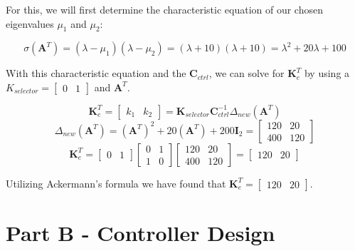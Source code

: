 \documentclass{article}
\begin{document}
For this, we will first determine the characteristic equation of our chosen eigenvalues $\mu_1$ and $\mu_2$:

\begin{equation}
    \sigma(\boldsymbol{A}^T) = (\lambda-\mu_1)(\lambda-\mu_2) = (\lambda+10)(\lambda+10) = \lambda^2 + 20 \lambda + 100
\end{equation}

With this characteristic equation and the $\boldsymbol{C}_{ctrl}$, we can solve for $\boldsymbol{K}_e^T$ by using a $K_{selector}=\begin{bmatrix}
    0 & 1
\end{bmatrix}$ and $\boldsymbol{A}^T$.

\begin{equation}
    \boldsymbol{K}_e^T = \begin{bmatrix}k_1 & k_2\end{bmatrix} = \boldsymbol{K}_{selector} \boldsymbol{C}_{ctrl}^{-1} \Delta_{new}(\boldsymbol{A}^T)
\end{equation}
\begin{equation}
    \Delta_{new}(\boldsymbol{A}^T) = (\boldsymbol{A}^T)^2+20(\boldsymbol{A}^T)+200\boldsymbol{I}_2 = \begin{bmatrix}
        120 & 20 \\ 400 & 120
    \end{bmatrix}
\end{equation}
\begin{equation}
    \boldsymbol{K}_e^T = \begin{bmatrix}
        0 & 1
    \end{bmatrix} \begin{bmatrix}
        0 & 1 \\ 1 & 0
    \end{bmatrix} \begin{bmatrix}
        120 & 20 \\ 400 & 120
    \end{bmatrix} = \begin{bmatrix}
        120 & 20
    \end{bmatrix}
\end{equation}

Utilizing Ackermann's formula we have found that $\boldsymbol{K}_e^T = \begin{bmatrix}120 & 20\end{bmatrix}$.

\section*{Part B - Controller Design}
\end{document}
